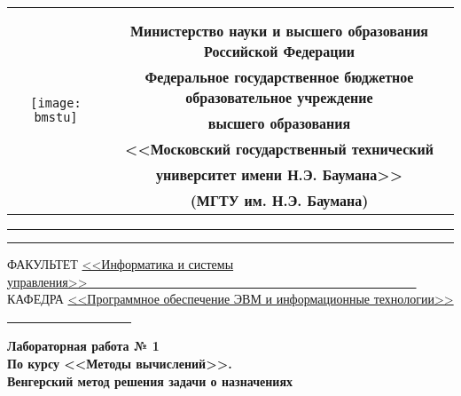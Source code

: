 \documentclass[a4paper,14pt]{article}
\begin{document}
\begin{titlepage}

    \begin{table}[H]
        \centering
        \footnotesize
        \begin{tabular}{cc}
            \multirow{8}{*}{\texttt{[image: bmstu]}}
            & \\
            & \\
            & \textbf{Министерство науки и высшего образования Российской Федерации} \\
            & \textbf{Федеральное государственное бюджетное образовательное учреждение} \\
            & \textbf{высшего образования} \\
            & \textbf{<<Московский государственный технический} \\
            & \textbf{университет имени Н.Э. Баумана>>} \\
            & \textbf{(МГТУ им. Н.Э. Баумана)} \\
        \end{tabular}
    \end{table}

    \begin{flushleft}
        \rule[-1cm]{\textwidth}{3pt}
        \rule{\textwidth}{1pt}
    \end{flushleft}

    \begin{flushleft}
        \small
        ФАКУЛЬТЕТ
        \underline{<<Информатика и системы управления>>\ \ \ \ \ \ \ 
        \ \ \ \ \ \ \ \ \ \ \ \ \ \ \ \ \ \ \ \ \ \ \ \ \ \ \ \ \ \ \ 
    \ \ \ \ \ \ \ \ \ \ \ \ \ \ \ } \\
        КАФЕДРА
        \underline{<<Программное обеспечение ЭВМ и
        информационные технологии>>
        \ \ \ \ \ \ \ \ \ \ \ \ \ \ \ \ \ \ \ \ }
    \end{flushleft}

    \vspace{4cm}

     \begin{center}
        \textbf{Лабораторная работа № 1} \\
        \textbf{По курсу <<Методы вычислений>>.} \\
        \vspace{0.5cm}
        \textbf{Венгерский метод решения задачи о назначениях}
    \end{center}


\end{titlepage}
\end{document}
